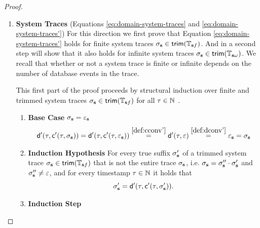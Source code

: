 \begin{proof}
\begin{enumerate}
        We have now shown \ref{eq:domain-mfotl-traces} 
        for both finite and infinite traces,
        which directly implies \ref{eq:domain-mfotl-traces'}.
        
        \item \textbf{System Traces}
            (Equations \ref{eq:domain-system-traces} and 
            \ref{eq:domain-system-traces'})
        For this direction we first prove that Equation
        \ref{eq:domain-system-traces'} holds for finite
        system traces $\sigma_{\mathbf{s}} \in \mathsf{trim}(\mathbb{T}_{\mathbf{s} f})$.
        And in a second step will show that it also holds
        for infinite system traces $\sigma_{\mathbf{s}} \in \mathsf{trim}(\mathbb{T}_{\mathbf{s} \omega})$.
        We recall that whether or not a system trace
        is finite or infinite depends on the number of
        database events in the trace.

        This first part of the proof proceeds
        by structural induction over finite and trimmed system traces
        $\sigma_{\mathbf{s}} \in \mathsf{trim}(\mathbb{T}_{\mathbf{s} f})$ for all $\tau \in \mathbb{N}$ .
            \begin{enumerate}
                \item
                \textbf{Base Case} $\sigma_{\mathbf{s}} = \varepsilon_{\mathbf{s}}$
                \begin{align*}
                    \mathsf{d}'(\tau, \mathsf{c}'(\tau, \sigma_{\mathbf{s}}))
                    =  \mathsf{d}'(\tau, \mathsf{c}'(\tau, \varepsilon_{\mathbf{s}}))
                    \stackrel{\ref{def:cconv'}}{=}
                        \mathsf{d}'(\tau, \varepsilon)
                    \stackrel{\ref{def:dconv'}}{=}
                        \varepsilon_{\mathbf{s}}
                    = \sigma_{\mathbf{s}}
                \end{align*}
                \item \textbf{Induction Hypothesis}
                For every true suffix $\sigma_{\mathbf{s}}'$ of a trimmed system trace
                $\sigma_{\mathbf{s}} \in \mathsf{trim}(\mathbb{T}_{\mathbf{s} f})$
                that is not the entire trace $\sigma_{\mathbf{s}}$, i.e.
                $\sigma_{\mathbf{s}} = \sigma_{\mathbf{s}}'' \cdot \sigma_{\mathbf{s}}'$ and
                $\sigma_{\mathbf{s}}'' \neq \varepsilon$,
                and for every timestamp $\tau \in \mathbb{N}$
                it holds that
                \begin{equation*}
                    \sigma_{\mathbf{s}}'
                    = \mathsf{d}'(\tau, \mathsf{c}'(\tau, \sigma_{\mathbf{s}}')).
                \end{equation*}

                \item \textbf{Induction Step}


\end{enumerate}
\end{enumerate}
\end{proof}
